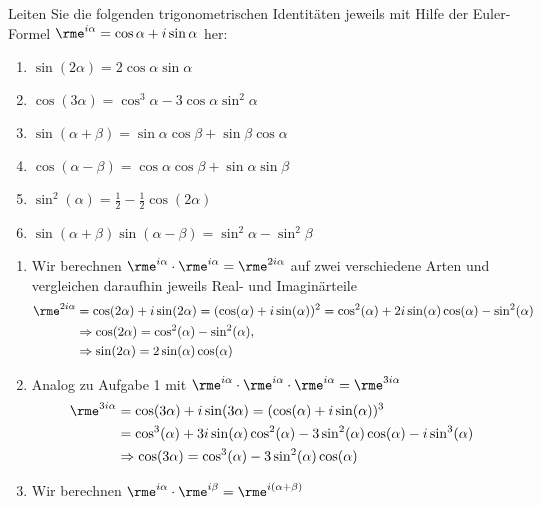 \documentclass[12pt]{exam}
\begin{document}
\begin{questions}

Leiten Sie die folgenden trigonometrischen Identitäten jeweils mit Hilfe der Euler-Formel $\rme^{i\alpha}=\cos\alpha+i\sin\alpha$ her:\\
\parbox{0.5\textwidth}{\begin{enumerate}
		\item $\sin(2\alpha)=2\cos\alpha\sin\alpha$
		\item $\cos(3\alpha)=\cos^3\alpha-3\cos\alpha\sin^2\alpha$
		\item $\sin(\alpha+\beta)=\sin\alpha\cos\beta+\sin\beta\cos\alpha$
\end{enumerate}}\parbox{0.5\textwidth}{\begin{enumerate}\setcounter{enumi}{3}
		\item $\cos(\alpha-\beta)=\cos\alpha\cos\beta+\sin\alpha\sin\beta$
		\item $\sin^2(\alpha)=\frac{1}{2}-\frac{1}{2}\cos(2\alpha)$
		\item $\sin(\alpha+\beta)\sin(\alpha-\beta)=\sin^2\alpha-\sin^2\beta$
\end{enumerate}}
\begin{solution}
	\begin{enumerate}
	\item Wir berechnen $\rme^{i\alpha}\cdot \rme^{i\alpha}=\rme^{2i\alpha}$ auf zwei verschiedene Arten und vergleichen daraufhin jeweils Real- und Imaginärteile
	\begin{align*}
		\rme^{2i\alpha}&=\cos(2\alpha)+i\sin(2\alpha)=(\cos(\alpha)+i\sin(\alpha))^2=\cos^2(\alpha)+2i\sin(\alpha)\cos(\alpha)-\sin^2(\alpha)\\
		&\Rightarrow \cos(2\alpha)=\cos^2(\alpha)-\sin^2(\alpha),\\
		&\Rightarrow \sin(2\alpha)=2\sin(\alpha)\cos(\alpha)
	\end{align*}
	\item Analog zu Aufgabe 1 mit $\rme^{i\alpha}\cdot \rme^{i\alpha}\cdot \rme^{i\alpha}=\rme^{3i\alpha}$
	\begin{align*}
		\rme^{3i\alpha}&=\cos(3\alpha)+i\sin(3\alpha)=(\cos(\alpha)+i\sin(\alpha))^3\\
		&=\cos^3(\alpha)+3i\sin(\alpha)\cos^2(\alpha)-3\sin^2(\alpha)\cos(\alpha)-i\sin^3(\alpha)\\
		&\Rightarrow \cos(3\alpha)=\cos^3(\alpha)-3\sin^2(\alpha)\cos(\alpha)
	\end{align*}
	\item Wir berechnen $\rme^{i\alpha}\cdot\rme^{i\beta}=\rme^{i(\alpha+\beta)}$

\end{enumerate}
\end{solution}
\end{questions}
\end{document}
